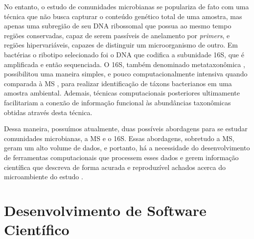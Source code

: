 \documentclass[
	12pt,				%
	oneside,			%
	a4paper,			%
	chapter=TITLE,		%
	section=TITLE,		%
	english,			%
	brazil				%
	]{abntex2}
\begin{document}
No entanto, o estudo de comunidades microbianas se populariza de fato com uma técnica que não busca capturar o conteúdo genético total de uma amostra, mas apenas uma subregião de seu \gls{DNA} ribossomal que possua ao mesmo tempo regiões conservadas, capaz de serem passíveis de anelamento por \emph{primers}, e regiões hipervariáveis, capazes de distinguir um microorganismo de outro. Em bactérias o ribotipo selecionado foi o \gls{DNA} que codifica a subunidade 16S, que é amplificada e então sequenciada. O \gls{16S}, também denominado metataxonômica \autocite{marchesi2015}, possibilitou uma maneira simples, e pouco computacionalmente intensiva quando comparada à \gls{MS} \autocite{tremblay2022}, para realizar identificação de táxons bacterianos em uma amostra ambiental. Ademais, técnicas computacionais posteriores ultimamente facilitariam a conexão de informação funcional às abundâncias taxonômicas obtidas através desta técnica.

Dessa maneira, possuímos atualmente, duas possíveis abordagens para se estudar comunidades microbianas, a \gls{MS} e o \gls{16S}. Essas abordagens, sobretudo a \gls{MS}, geram um alto volume de dados, e portanto, há a necessidade do desenvolvimento de ferramentas computacionais que processem esses dados e gerem informação científica que descreva de forma acurada e reproduzível achados acerca do microambiente do estudo \autocite{comin2021}.

\section{Desenvolvimento de Software Científico}\label{desenvolvimento-de-software-cientuxedfico}
\end{document}
